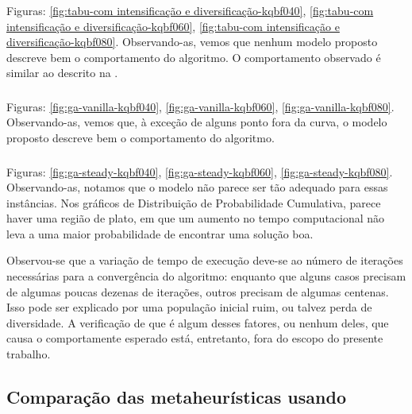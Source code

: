\subsubsection{\tabuMod}
\label{subsubsection:ttt-validation-tabu-mod}

Figuras: \ref{fig:tabu-com intensificação e diversificação-kqbf040}, \ref{fig:tabu-com intensificação e diversificação-kqbf060},
\ref{fig:tabu-com intensificação e diversificação-kqbf080}. Observando-as, vemos que nenhum modelo proposto descreve bem o comportamento do algoritmo. O comportamento observado é similar ao descrito na .

\subsubsection{\geneticVanilla}
\label{subsubsection:ttt-validation-ga-vanilla}

Figuras: \ref{fig:ga-vanilla-kqbf040}, \ref{fig:ga-vanilla-kqbf060},
\ref{fig:ga-vanilla-kqbf080}. Observando-as, vemos que, à exceção de alguns ponto fora da curva, o modelo proposto descreve bem o comportamento do algoritmo.

\subsubsection{\geneticSteady}
\label{subsubsection:ttt-validation-ga-steady}

Figuras: \ref{fig:ga-steady-kqbf040}, \ref{fig:ga-steady-kqbf060},
\ref{fig:ga-steady-kqbf080}. Observando-as, notamos que o modelo não parece ser tão adequado para essas instâncias. Nos gráficos de Distribuição de Probabilidade Cumulativa, parece haver uma região de plato, em que um aumento no tempo computacional não leva a uma maior probabilidade de encontrar uma solução boa.

Observou-se que a variação de tempo de execução deve-se ao número de iterações necessárias para a convergência do algoritmo: enquanto que alguns casos precisam de algumas poucas dezenas de iterações, outros precisam de algumas centenas. Isso pode ser explicado por uma população inicial ruim, ou talvez perda de diversidade. A verificação de que é algum desses fatores, ou nenhum deles, que causa o comportamente esperado está, entretanto, fora do escopo do presente trabalho.

\subsection{Comparação das metaheurísticas usando \ttt}

